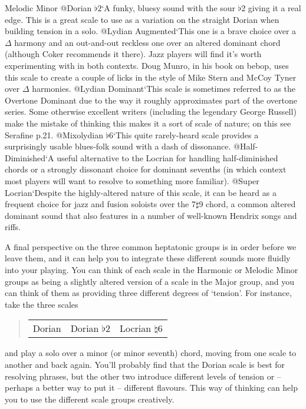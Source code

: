 \documentclass[english]{./gbook}
\begin{document}
\begin{large}
Melodic Minor
@Dorian $\flat 2$`A funky, bluesy sound with the sour $\flat$2 giving it a real edge. This is a great scale to use as a variation on the straight Dorian when building tension in a solo.
@Lydian Augmented`This one is a brave choice over a $\Delta$ harmony and an out-and-out reckless one over an altered dominant chord (although Coker recommends it there). Jazz players will find it's worth experimenting with in both contexts. Doug Munro, in his book on bebop, uses this scale to create a couple of licks in the style of Mike Stern and McCoy Tyner over $\Delta$ harmonies.
@Lydian Dominant`This scale is sometimes referred to as the Overtone Dominant due to the way it roughly approximates part of the overtone series. Some otherwise excellent writers (including the legendary George Russell) make the mistake of thinking this makes it a sort of scale of nature; on this see Serafine p.21.
@Mixolydian $\flat 6$`This quite rarely-heard scale provides a surprisingly usable blues-folk sound with a dash of dissonance.
@Half-Diminished`A useful alternative to the Locrian for handling half-diminished chords or a strongly dissonant choice for dominant sevenths (in which context most players will want to resolve to something more familiar).
@Super Locrian`Despite the highly-altered nature of this scale, it can be heard as a frequent choice for jazz and fusion soloists over the 7$\sharp$9 chord, a common altered dominant sound that also features in a number of well-known Hendrix songs and riffs.
%

A final perspective on the three common heptatonic groups is in order before we leave them, and it can help you to integrate these different sounds more fluidly into your playing. You can think of each scale in the Harmonic or Melodic Minor groups as being a slightly altered version of a scale in the Major group, and you can think of them as providing three different degrees of `tension'. For instance, take the three scales
\begin{quote}
	\begin{tabular}{l|l|l}
		Dorian & Dorian $\flat 2$ & Locrian $\natural 6$
	\end{tabular}
\end{quote}
and play a solo over a minor (or minor seventh) chord, moving from one scale to another and back again. You'll probably find that the Dorian scale is best for resolving phrases, but the other two introduce different levels of tension or -- perhaps a better way to put it -- different flavours. This way of thinking can help you to use the different scale groups creatively.


\end{large}
\end{document}
